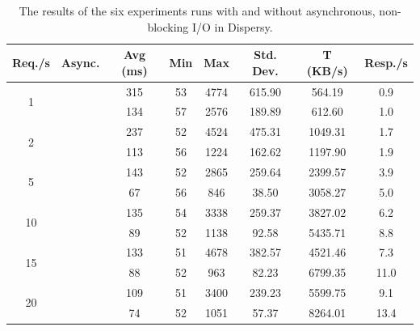 \begin{table}[!h]
	\centering
	\caption{The results of the six experiments runs with and without asynchronous, non-blocking I/O in Dispersy.}
	\label{table:responsiveness_tribler_load}
	\begin{tabular}{|c|c|c|c|c|c|c|c|}
		\hline
		Req./s              & Async. & Avg (ms) & Min & Max & Std. Dev. & T (KB/s) & Resp./s \\ \hline
		\multirow{2}{*}{1}  & \xmark      & 315 & 53  & 4774 & 615.90    & 564.19            & 0.9         \\ \cline{2-8} 
		& \cmark      & 134 & 57  & 2576 & 189.89    & 612.60            & 1.0         \\ \hline
		\multirow{2}{*}{2}  & \xmark       & 237 & 52  & 4524 & 475.31    & 1049.31           & 1.7         \\ \cline{2-8} 
		& \cmark      & 113 & 56  & 1224 & 162.62    & 1197.90           & 1.9         \\ \hline
		\multirow{2}{*}{5}  & \xmark       & 143 & 52  & 2865 & 259.64    & 2399.57           & 3.9         \\ \cline{2-8} 
		& \cmark      & 67  & 56  & 846  & 38.50     & 3058.27           & 5.0         \\ \hline
		\multirow{2}{*}{10} & \xmark       & 135 & 54  & 3338 & 259.37    & 3827.02           & 6.2         \\ \cline{2-8} 
		& \cmark      & 89  & 52  & 1138 & 92.58     & 5435.71           & 8.8         \\ \hline
		\multirow{2}{*}{15} & \xmark       & 133 & 51  & 4678 & 382.57    & 4521.46           & 7.3         \\ \cline{2-8} 
		& \cmark      & 88  & 52  & 963  & 82.23     & 6799.35           & 11.0        \\ \hline
		\multirow{2}{*}{20} & \xmark       & 109 & 51  & 3400 & 239.23    & 5599.75           & 9.1         \\ \cline{2-8} 
		& \cmark      & 74  & 52  & 1051 & 57.37     & 8264.01           & 13.4        \\ \hline
	\end{tabular}
\end{table}

